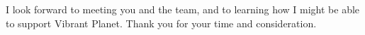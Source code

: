 I look forward to meeting you and the team, and to learning how I might be able to support Vibrant Planet.
Thank you for your time and consideration.


\vspace{10pt}

\makeletterclosing


